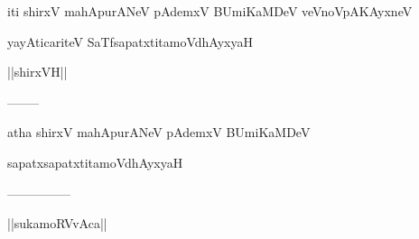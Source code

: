 \documentclass{article}
\begin{document}
\begin{center}
iti shirxV mahApurANeV pAdemxV BUmiKaMDeV veVnoVpAKAyxneV
\end{center}

\begin{center}
yayAticariteV SaTfsapatxtitamoVdhAyxyaH
\end{center}

\begin{center}
||shirxVH||
\end{center}

\begin{center}
--------
\end{center}

\begin{center}
atha shirxV mahApurANeV pAdemxV BUmiKaMDeV
\end{center}

\begin{center}
sapatxsapatxtitamoVdhAyxyaH
\end{center}

\begin{center}

---------------
\end{center}

\begin{center}
||sukamoRVvAca||
\end{center}
\end{document}
